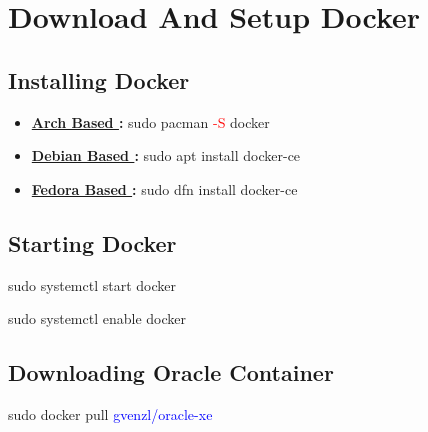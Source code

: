 \section{Download And Setup Docker}
\subsection{Installing Docker}
\begin{tcolorbox}[title = Docker]
    \begin{itemize}
        \item \textbf{\underline{Arch Based }: }\hspace{1cm}\textcolor{Sudo}{sudo} \textcolor{greenCommand}{pacman} \textcolor{red}{-S} docker
        \item \textbf{\underline{Debian Based }: }\hspace{0.6cm}\textcolor{Sudo}{sudo} \textcolor{greenCommand}{apt install} docker-ce
        \item \textbf{\underline{Fedora Based }: }\hspace{0.5cm} \textcolor{Sudo}{sudo} \textcolor{greenCommand}{dfn install} docker-ce
    \end{itemize}
\end{tcolorbox}
\subsection{Starting Docker}
\begin{tcolorbox}
    \textcolor{Sudo}{sudo} \textcolor{greenCommand}{systemctl start} docker
   
    \textcolor{Sudo}{sudo} \textcolor{greenCommand}{systemctl enable} docker
\end{tcolorbox}
\subsection{Downloading Oracle Container}
\begin{tcolorbox}[title = Pulling Oracle-xe]
    \textcolor{Sudo}{sudo} \textcolor{greenCommand}{docker pull} \textcolor{blue}{gvenzl/oracle-xe}
\end{tcolorbox}
